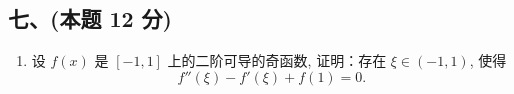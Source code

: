 \subsection*{七、(本题 12 分)}
\begin{enumerate}[start=11]
    \item 设 $f(x)$ 是 $[-1,1]$ 上的二阶可导的奇函数, 证明：存在 $\xi \in (-1,1)$, 使得
          \[
              f''(\xi) - f'(\xi) + f(1) = 0.
          \]
\end{enumerate}
